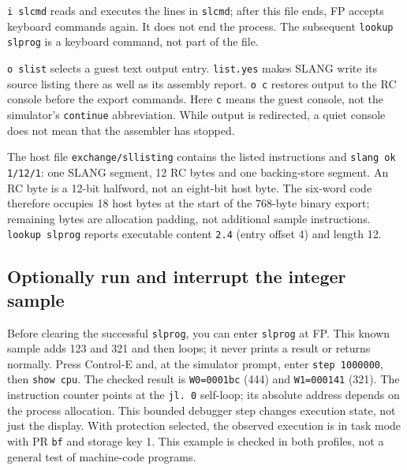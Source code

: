 \passthrough{\lstinline!i slcmd!} reads and executes the lines in \passthrough{\lstinline!slcmd!}; after this file ends, FP accepts keyboard commands again. It does not end the process. The subsequent \passthrough{\lstinline!lookup slprog!} is a keyboard command, not part of the file.

\passthrough{\lstinline!o slist!} selects a guest text output entry. \passthrough{\lstinline!list.yes!} makes SLANG write its source listing there as well as its assembly report. \passthrough{\lstinline!o c!} restores output to the RC console before the export commands. Here \passthrough{\lstinline!c!} means the guest console, not the simulator's \passthrough{\lstinline!continue!} abbreviation. While output is redirected, a quiet console does not mean that the assembler has stopped.

The host file \passthrough{\lstinline!exchange/sllisting!} contains the listed instructions and \passthrough{\lstinline!slang ok 1/12/1!}: one SLANG segment, 12 RC bytes and one backing-store segment. An RC byte is a 12-bit halfword, not an eight-bit host byte. The six-word code therefore occupies 18 host bytes at the start of the 768-byte binary export; remaining bytes are allocation padding, not additional sample instructions. \passthrough{\lstinline!lookup slprog!} reports executable content \passthrough{\lstinline!2.4!} (entry offset 4) and length 12.

\subsection{Optionally run and interrupt the integer sample}\label{run-and-interrupt-slang-sample}

Before clearing the successful \texttt{slprog}, you can enter \texttt{slprog}
at FP. This known sample adds 123 and 321 and then loops; it never prints a
result or returns normally. Press Control-E and, at the simulator prompt,
enter \texttt{step 1000000}, then \texttt{show cpu}. The checked result is
\texttt{W0=0001bc} (444) and \texttt{W1=000141} (321). The instruction counter
points at the \texttt{jl. 0} self-loop; its absolute address depends on the
process allocation. This bounded debugger step changes execution state, not
just the display. With protection selected, the observed execution is in task
mode with PR \texttt{bf} and storage key 1. This example is checked in both
profiles, not a general test of machine-code programs.

